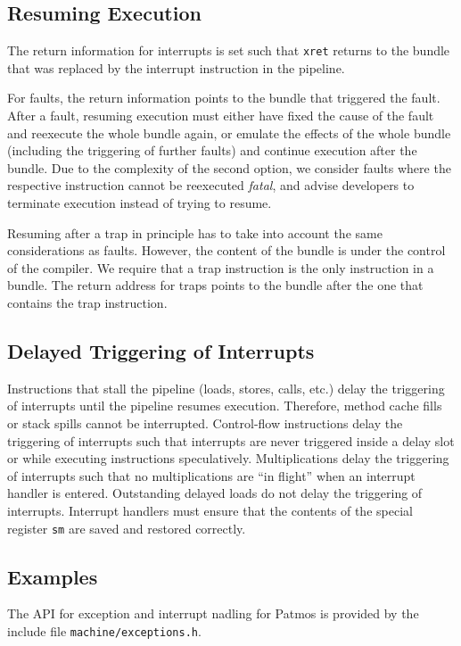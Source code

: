 \documentclass[a4paper,fontsize=10pt,twoside,DIV15,BCOR12mm,headinclude=true,footinclude=false,pagesize,bibtotoc]{scrbook}
\begin{document}
\subsection{Resuming Execution}

The return information for interrupts is set such that \texttt{xret}
returns to the bundle that was replaced by the interrupt
instruction in the pipeline.

For faults, the return information points to the bundle that triggered
the fault. After a fault, resuming execution must either have fixed
the cause of the fault and reexecute the whole bundle again, or
emulate the effects of the whole bundle (including the triggering of
further faults) and continue execution after the bundle. Due to the
complexity of the second option, we consider faults where the
respective instruction cannot be reexecuted \emph{fatal}, and advise
developers to terminate execution instead of trying to resume.

Resuming after a trap in principle has to take into account the same
considerations as faults. However, the content of the bundle is under
the control of the compiler. We require that a trap instruction is the
only instruction in a bundle. The return address for traps points to
the bundle after the one that contains the trap instruction.

\subsection{Delayed Triggering of Interrupts}

Instructions that stall the pipeline (loads, stores, calls, etc.)
delay the triggering of interrupts until the pipeline resumes
execution. Therefore, method cache fills or stack spills cannot be
interrupted. Control-flow instructions delay the triggering of
interrupts such that interrupts are never triggered inside a delay
slot or while executing instructions speculatively. Multiplications
delay the triggering of interrupts such that no multiplications are
``in flight'' when an interrupt handler is entered. Outstanding
delayed loads do not delay the triggering of interrupts. Interrupt
handlers must ensure that the contents of the special register
\texttt{sm} are saved and restored correctly.

\subsection{Examples}

The API for exception and interrupt nadling for Patmos is provided by
the include file \texttt{machine/exceptions.h}.
\end{document}
